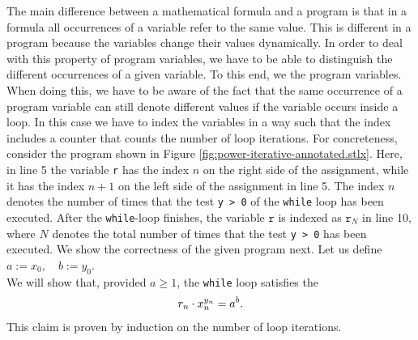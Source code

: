 The main difference between a mathematical formula and a program is that in a formula all
occurrences of a variable refer to the same value.   This is different in a program because the
variables change their values dynamically.  In order to deal with this property of program variables,
we have to be able to distinguish the different occurrences of a given variable.  To this end,  we 
 the program variables. 
When doing this, we have to be aware of the fact that the same occurrence of a program variable can
still denote different values if the variable occurs inside  a loop.  In this case we have to index
the variables in a way such that the index includes a counter that counts the number of loop iterations.
For concreteness, consider the  program shown in 
Figure \ref{fig:power-iterative-annotated.stlx}.  
Here, in line 5 the variable \texttt{r} has the index $n$ on the right side of the assignment,
while it has the index $n+1$ on the left side of the assignment in line 5.  The index $n$ denotes 
the number of times that the test \texttt{y > 0} of the \texttt{while} loop has been executed.
After the \texttt{while}-loop finishes, the variable $\texttt{r}$ is indexed as
$\texttt{r}_N$ in line 10, where $N$ denotes the total number of times that the test \texttt{y > 0} has been executed.
We show the correctness of the given program next.  Let us define
\\[0.2cm]
\hspace*{1.3cm}
$ a := x_0, \quad b := y_0$.
\\[0.2cm]
We will show that, provided $a \geq 1$, the \texttt{while} loop satisfies the 
\begin{equation}
  \label{eq:powerInv}
  \displaystyle r_n \cdot x_n^{y_n} = a^b.
\end{equation}
This claim is proven by induction on the number of loop iterations.
